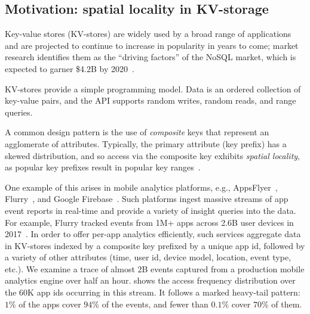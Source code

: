 \subsection{Motivation:  spatial locality in KV-storage}

Key-value stores (KV-stores) are widely used  by a broad range of applications and are projected
to continue to increase in popularity in years to come; market research  identifies them as the 
``driving factors'' of the NoSQL market, which is expected to garner \$4.2B by 2020~\cite{alliedmarketresearch}.

KV-stores provide a simple programming model. 
Data is an ordered collection of key-value pairs, and the API supports random writes, 
random reads, and range queries. 

A common design pattern is the use of \emph{composite} keys that represent an agglomerate of attributes.
Typically, the primary attribute (key prefix) %
has a skewed distribution, and so   access via the composite key exhibits \emph{spatial locality}, as 
popular key prefixes result in popular key ranges~\cite{facebook-workloads}. 

One example of this arises in mobile analytics platforms, e.g., AppsFlyer~\cite{appsflyer}, Flurry~\cite{flurry}, 
and Google Firebase~\cite{firebase}. %
Such platforms %
ingest massive streams of app event reports %
in  real-time and provide a variety of insight queries into the data. For example, Flurry tracked events from  
1M+ apps across 2.6B user devices  in 2017~\cite{FlurryReport2017}. In order to offer per-app analytics efficiently,
such services aggregate data in KV-stores indexed by a composite key prefixed by a unique app 
id,  followed by a variety of other attributes (time, user id, device model, location, event type, etc.).
%
We examine a trace of almost $2$B  events captured from a production mobile analytics engine 
over half an hour.  
 shows the access frequency distribution over the  $60$K app ids occurring in this stream. It follows a marked
heavy-tail pattern: 
$1$\% of the apps  cover $94$\% of the events, and fewer 
than $0.1$\% cover $70$\% of them. 


